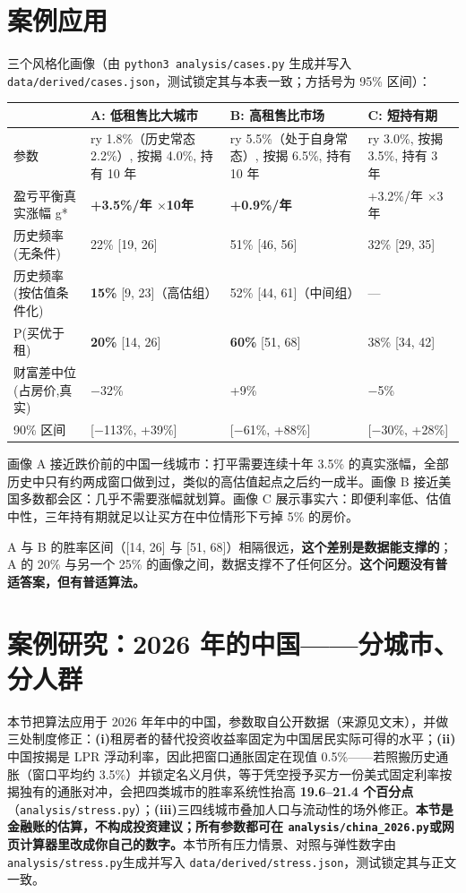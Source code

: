 \documentclass[11pt,a4paper]{ctexart}
\begin{document}
\section{案例应用}

三个风格化画像（由 \texttt{python3 analysis/cases.py} 生成并写入 \texttt{data/derived/cases.json}，测试锁定其与本表一致；方括号为 95\% 区间）：

\begin{table}[H]\centering\small
\begin{tabularx}{\textwidth}{lXXX}
\toprule
 & A: 低租售比大城市 & B: 高租售比市场 & C: 短持有期 \\
\midrule
参数 & ry 1.8\%（历史常态 2.2\%）, 按揭 4.0\%, 持有 10 年 & ry 5.5\%（处于自身常态）, 按揭 6.5\%, 持有 10 年 & ry 3.0\%, 按揭 3.5\%, 持有 3 年 \\
盈亏平衡真实涨幅 g* & \textbf{+3.5\%/年 $\times$10年} & \textbf{+0.9\%/年} & +3.2\%/年 $\times$3年 \\
历史频率(无条件) & 22\% [19, 26] & 51\% [46, 56] & 32\% [29, 35] \\
历史频率(按估值条件化) & \textbf{15\%} [9, 23]（高估组） & 52\% [44, 61]（中间组） & — \\
P(买优于租) & \textbf{20\%} [14, 26] & \textbf{60\%} [51, 68] & 38\% [34, 42] \\
财富差中位(占房价,真实) & $-$32\% & +9\% & $-$5\% \\
90\% 区间 & [$-$113\%, +39\%] & [$-$61\%, +88\%] & [$-$30\%, +28\%] \\
\bottomrule
\end{tabularx}
\end{table}

画像 A 接近跌价前的中国一线城市：打平需要连续十年 3.5\% 的真实涨幅，全部历史中只有约两成窗口做到过，类似的高估值起点之后约一成半。画像 B 接近美国多数都会区：几乎不需要涨幅就划算。画像 C 展示事实六：即便利率低、估值中性，三年持有期就足以让买方在中位情形下亏掉 5\% 的房价。

A 与 B 的胜率区间（[14, 26] 与 [51, 68]）相隔很远，\textbf{这个差别是数据能支撑的}；A 的 20\% 与另一个 25\% 的画像之间，数据支撑不了任何区分。\textbf{这个问题没有普适答案，但有普适算法。}

\section{案例研究：2026 年的中国——分城市、分人群}

本节把算法应用于 2026 年年中的中国，参数取自公开数据（来源见文末），并做三处制度修正：\textbf{(i)}租房者的替代投资收益率固定为中国居民实际可得的水平；\textbf{(ii)}中国按揭是 LPR 浮动利率，因此把窗口通胀固定在现值 0.5\%——若照搬历史通胀（窗口平均约 3.5\%）并锁定名义月供，等于凭空授予买方一份美式固定利率按揭独有的通胀对冲，会把四类城市的胜率系统性抬高 \textbf{19.6--21.4 个百分点}（\texttt{analysis/stress.py}）；\textbf{(iii)}三四线城市叠加人口与流动性的场外修正。\textbf{本节是金融账的估算，不构成投资建议；所有参数都可在 \texttt{analysis/china\_2026.py}或网页计算器里改成你自己的数字。}本节所有压力情景、对照与弹性数字由 \texttt{analysis/stress.py}生成并写入 \texttt{data/derived/stress.json}，测试锁定其与正文一致。
\end{document}
